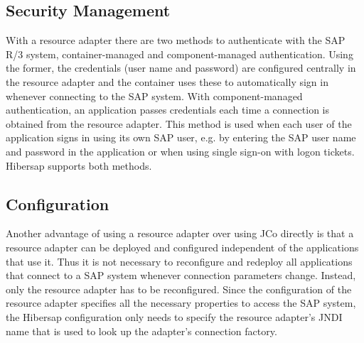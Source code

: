 
\subsection{Security Management}
With a resource adapter there are two methods to authenticate with the SAP R/3 system, container-managed and component-managed authentication. Using the former, the credentials (user name and password) are configured centrally in the resource adapter and the container uses these to automatically sign in whenever connecting to the SAP system. With component-managed authentication, an application passes credentials each time a connection is obtained from the resource adapter. This method is used when each user of the application signs in using its own SAP user, e.g. by entering the SAP user name and password in the application or when using single sign-on with logon tickets. Hibersap supports both methods.

\subsection{Configuration}
Another advantage of using a resource adapter over using JCo directly is that a resource adapter can be deployed and configured independent of the applications that use it. Thus it is not necessary to reconfigure and redeploy all applications that connect to a SAP system whenever connection parameters change. Instead, only the resource adapter has to be reconfigured. Since the configuration of the resource adapter specifies all the necessary properties to access the SAP system, the Hibersap configuration only needs to specify the resource adapter's JNDI name that is used to look up the adapter's connection factory. 

